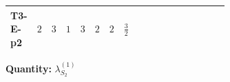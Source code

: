 \documentclass[8pt]{article}
\begin{document}
\begin{landscape}
\begin{longtable}{@{}llcccccc >{\raggedright\arraybackslash}p{0.21\linewidth} >{\raggedright\arraybackslash}p{0.21\linewidth} >{\raggedright\arraybackslash}p{0.21\linewidth}@{}}
\midrule
T3-E-p2 & $2$ & $3$ & $1$ & $3$ & $2$ & $2$ & $\frac{3}{2}$ & \scriptsize\adjustbox{max width=\linewidth}{$\begin{gathered} +\frac{3 {\lambda_{HS_2}^{(A)}}^2}{2}\end{gathered}$} & \scriptsize\adjustbox{max width=\linewidth}{$\begin{gathered} +14 {\lambda_{S_2}^{(1)}}^2\end{gathered}$} & \scriptsize\adjustbox{max width=\linewidth}{$\begin{gathered} +26 {\lambda_{S_2}^{(A)}}^2\end{gathered}$} \\
\midrule
\bottomrule
\end{longtable}
\clearpage
\noindent\textbf{Quantity: }$\lambda_{S_2}^{(1)}$\par\smallskip

\end{landscape}
\end{document}
